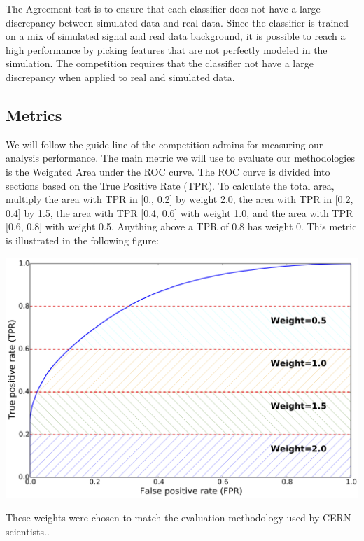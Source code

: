 \documentclass{article} %
\begin{document}
The Agreement test is to ensure that each classifier does not have a large discrepancy between simulated data and real data. Since the classifier is trained on a mix of simulated signal and real data background, it is possible to reach a high performance by picking features that are not perfectly modeled in the simulation. The competition requires that the classifier not have a large discrepancy when applied to real and simulated data. \cite{kaggleComp}
\subsection*{Metrics}
We will follow the guide line of the competition admins for measuring our analysis performance. The main metric we will use to evaluate our methodologies is the Weighted Area under the ROC curve. The ROC curve is divided into sections based on the True Positive Rate (TPR). To calculate the total area, multiply the area with TPR in [0., 0.2] by weight 2.0, the area with TPR in [0.2, 0.4] by 1.5, the area with TPR [0.4, 0.6] with weight 1.0, and the area with TPR [0.6, 0.8] with weight 0.5. Anything above a TPR of 0.8 has weight 0. This metric is illustrated in the following figure:
\begin{center}
	\includegraphics[scale = .3]{roc_optimistic}
\end{center} 
These weights were chosen to match the evaluation methodology used by CERN scientists.\cite{kaggleComp}.

\printbibliography
\end{document}
